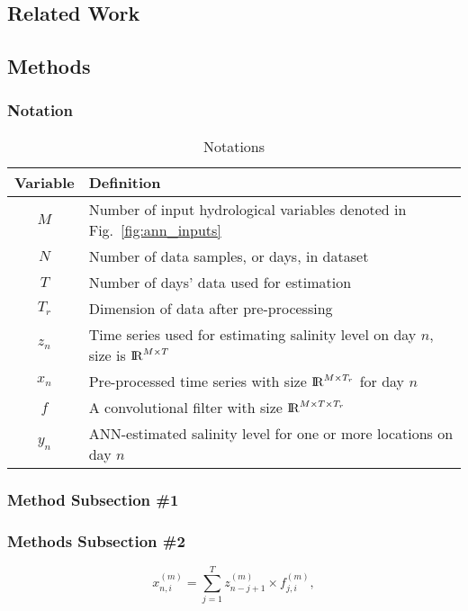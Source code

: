 
\blindtext 
\blindtext

\subsection{Related Work}

\blindtext
\blindtext
\blindtext

\subsection{Methods}

\blindtext

\subsubsection{Notation}

\blindtext

\begin{table}[htb]
	\caption{Notations}
	\label{table:notation}
	\centering
	\begin{tabular}[]{c|l}
		\toprule
		Variable & Definition \\
		\midrule
		$M$ & Number of input hydrological variables denoted in Fig.~\ref{fig:ann_inputs}\\
		\hline
		$N$ & Number of data samples, or days, in dataset \\
		\hline
		$T$ & Number of days' data used for estimation \\
		\hline
		$T_r$ & Dimension of data after pre-processing\\
		\hline
		$z_{n}$ & Time series used for estimating salinity level on day $n$, size is ${\rm I\!R}^{M\times T}$ \\
		\hline
		$x_{n}$ & Pre-processed time series with size ${\rm I\!R}^{M\times T_r}$ for day $n$\\
		\hline
		$f$ & A convolutional filter with size ${\rm I\!R}^{M \times T \times T_r}$ \\
		\hline
		$y_{n}$ & ANN-estimated salinity level for one or more locations on day $n$ \\
		\bottomrule
	\end{tabular}
\end{table}


\subsubsection{Method Subsection \#1}
\label{sect:methods_sub1}

\blindtext
\blindtext

\subsubsection{Methods Subsection \#2}
\label{sect:methods_sub2}

\blindtext

\begin{equation}
x_{n,i}^{(m)} = \sum_{j=1}^{T}z_{n-j+1}^{(m)}\times f_{j,i}^{(m)},
\label{eq:conv}
\end{equation}

\blindtext
